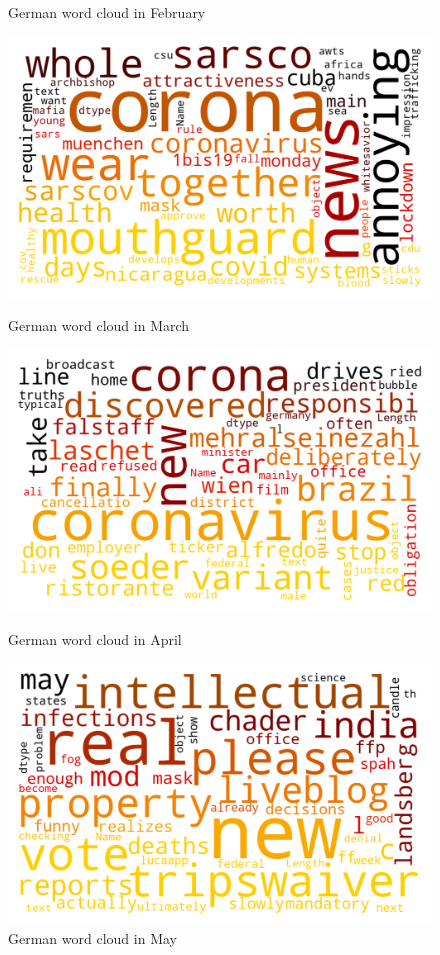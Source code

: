 \begin{landscape}
\begin{figure}[!htb]
  \caption{German word cloud in February}\label{fig:februaryde}
\endminipage
\end{figure}
\begin{figure}[!htb]
  \includegraphics[width=\linewidth]{March de word cloud.png}
  \caption{German word cloud in March}\label{fig:marchde}
\endminipage\hfill
{}
  \includegraphics[width=\linewidth]{April de word cloud.png}
  \caption{German word cloud in April}\label{fig:aprilde}
\endminipage\hfill
{}
  \includegraphics[width=\linewidth]{May de word cloud.png}
  \caption{German word cloud in May}\label{fig:mayde}
\endminipage
\end{figure}



\end{landscape}
